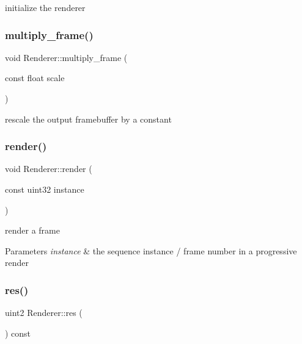initialize the renderer \mbox{\label{struct_renderer_ada44128e95feff3d6525ed641c092de0}} 
\subsubsection{\texorpdfstring{multiply\+\_\+frame()}{multiply\_frame()}}
{\footnotesize\ttfamily void Renderer\+::multiply\+\_\+frame (\begin{DoxyParamCaption}\item[{const float}]{scale }\end{DoxyParamCaption})}

rescale the output framebuffer by a constant \mbox{\label{struct_renderer_a1c07882208a3b4a37c5d19d2367cfa19}} 
\subsubsection{\texorpdfstring{render()}{render()}}
{\footnotesize\ttfamily void Renderer\+::render (\begin{DoxyParamCaption}\item[{const uint32}]{instance }\end{DoxyParamCaption})}

render a frame


\begin{DoxyParams}{Parameters}
{\em instance} & the sequence instance / frame number in a progressive render \\
\hline
\end{DoxyParams}
\mbox{\label{struct_renderer_a8279a55b932cc24163fda7ed636b3380}} 
\subsubsection{\texorpdfstring{res()}{res()}}
{\footnotesize\ttfamily uint2 Renderer\+::res (\begin{DoxyParamCaption}{ }\end{DoxyParamCaption}) const\hspace{0.3cm}{\ttfamily [inline]}}

